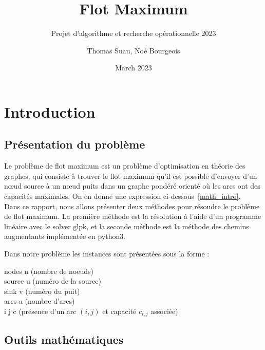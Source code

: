 \documentclass{article}[12pt]
\begin{document}
\title{Flot Maximum}
\subtitle{Projet d'algorithme et recherche opérationnelle 2023}
\author{Thomas Suau, Noé Bourgeois }
\date{March 2023}

\maketitle

 \newpage

\tableofcontents
 
 \newpage

\section{Introduction}

\subsection{Présentation du problème}
    Le problème de flot maximum est un problème d'optimisation en théorie des graphes, qui consiste à trouver le flot maximum qu'il est possible d'envoyer d'un nœud source à un nœud puits dans un graphe pondéré orienté où les arcs ont des capacités maximales. On en donne une expression ci-dessous \ref{math_intro}.\\
    
    Dans ce rapport, nous allons présenter deux méthodes pour résoudre le problème de flot maximum.
    La première méthode est la résolution à l'aide d'un programme linéaire avec le solver glpk, et la seconde méthode est la méthode des chemins augmentants implémentée en python3.
    
    Dans notre problème les instances sont présentées sous la forme : \\
	\begin{lslisting} %
		nodes n (nombre de noeuds)\\
		source u (numéro de la source)\\
		sink v (numéro du puit)\\
		arcs a (nombre d’arcs)\\
		i j c (présence d’un arc $(i,j)$ et capacité $c_{i,j}$ associée)
		
	\end{lslisting}
\subsection{Outils mathématiques \label{math_intro}}
\end{document}
